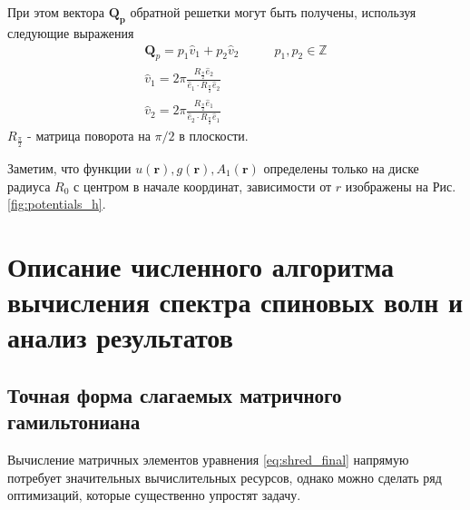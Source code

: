 \documentclass[a4paper,article,14pt]{extarticle}
\begin{document}
При этом вектора $\mathbf{Q_p}$ обратной решетки могут быть получены, используя следующие выражения
\begin{equation}
\begin{aligned}
\mathbf{Q}_p = p_1 \hat {v}_1 + p_2 \hat {v}_2  &\qquad p_1,p_2 \in \mathbb{Z} \\
\hat{v}_1 = 2 \pi  \frac{ R_{\frac \pi 2} \hat {e}_2}{\hat {e}_1   \cdot R_{\frac \pi 2} \hat {e}_2}  \\
\hat{v}_2 =  2 \pi  \frac{ R_{\frac \pi 2} \hat {e}_1}{\hat {e}_2 \cdot R_{\frac \pi 2} \hat {e}_1}
\end{aligned}
\end{equation}
$R_{\frac \pi 2}$ - матрица поворота на $\pi/2$ в плоскости.


Заметим, что функции $u(\mathbf{r}), g(\mathbf{r}), A_1(\mathbf{r})$ определены только на диске радиуса $R_0$ с центром в начале координат, зависимости от $r$ изображены на Рис. \ref{fig:potentials_h}.


\pagebreak

\section{Описание численного алгоритма вычисления спектра спиновых волн и анализ результатов}


\subsection{Точная форма слагаемых матричного гамильтониана}
Вычисление матричных элементов уравнения \eqref{eq:shred_final} напрямую потребует значительных вычислительных ресурсов, однако можно сделать ряд оптимизаций, которые существенно упростят задачу. 
\end{document}
